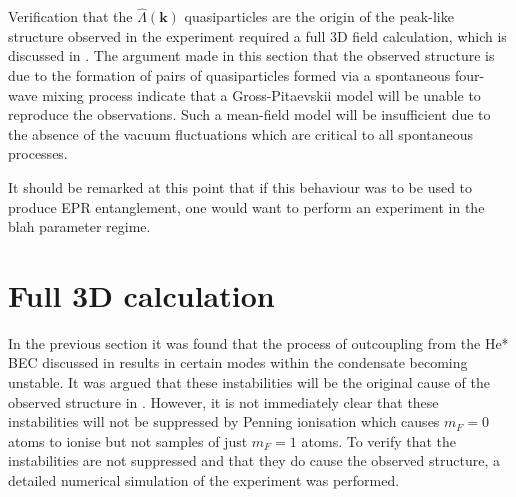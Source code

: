 Verification that the $\hat{\Lambda}(\bm{k})$ quasiparticles are the origin of the peak-like structure observed in the experiment required a full 3D field calculation, which is discussed in .  The argument made in this section that the observed structure is due to the formation of pairs of quasiparticles formed via a spontaneous four-wave mixing process indicate that a Gross-Pitaevskii model will be unable to reproduce the observations. Such a mean-field model will be insufficient due to the absence of the vacuum fluctuations which are critical to all spontaneous processes.

It should be remarked at this point that if this behaviour was to be used to produce EPR entanglement, one would want to perform an experiment in the blah parameter regime.


\section{Full 3D calculation}
\label{Peaks:3DCalculation}
In the previous section it was found that the process of outcoupling from the He* BEC discussed in  results in certain modes within the condensate becoming unstable. It was argued that these instabilities will be the original cause of the observed structure in . However, it is not immediately clear that these instabilities will not be suppressed by Penning ionisation which causes $m_F=0$ atoms to ionise but not samples of just $m_F=1$ atoms. To verify that the instabilities are not suppressed and that they do cause the observed structure, a detailed numerical simulation of the experiment was performed.

